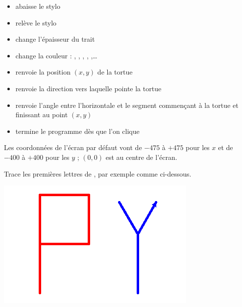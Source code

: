 \documentclass[11pt,class=report,crop=false]{standalone}
\begin{document}
\begin{cours}
\begin{itemize}
  
  \item {} abaisse le stylo
  \item {} relève le stylo
  \item {} change l'épaisseur du trait
  \item {} change la couleur : , , , , ,\ldots
  
  \item {}  renvoie la position $(x,y)$ de la tortue
  \item {} renvoie la direction  vers laquelle pointe la tortue
  \item {} renvoie l'angle entre l'horizontale et le segment commençant à la tortue et finissant au point $(x,y)$
  \item {} termine le programme dès que l'on clique
\end{itemize}

Les coordonnées de l'écran par défaut vont de $-475$ à $+475$ pour les $x$ et
de $-400$ à $+400$ pour les $y$ ; $(0,0)$ est au centre de l'écran.


\end{cours}



\begin{activite}


Trace les premières lettres de \Python{}, par exemple comme ci-dessous.

\begin{center}
\includegraphics[scale=\myscale,scale=0.4]{ecran-tortue-1}
\end{center}

\end{activite}
\end{document}
